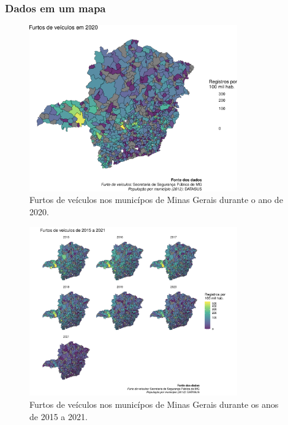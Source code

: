 \begin{frame}
\frametitle{Dados em um mapa}

\begin{figure}[h]
 \centering
 \includegraphics[width=0.8\textwidth,height=0.7\textheight,keepaspectratio]{figures/mg-furtos-veiculos-2020.pdf}
 \caption{Furtos de veículos nos municípos de Minas Gerais durante o ano de 2020.}
 \label{fig-mg-furtos-veiculos-2020}
\end{figure}

\framebreak

\begin{figure}[h]
 \centering
 \includegraphics[width=0.8\textwidth,height=0.7\textheight,keepaspectratio]{figures/mg-furtos-veiculos-2015a2021.png}
 \caption{Furtos de veículos nos municípos de Minas Gerais durante os anos de 2015 a 2021.}
 \label{fig-mg-furtos-veiculos-2015a2021}
\end{figure}


\end{frame}
